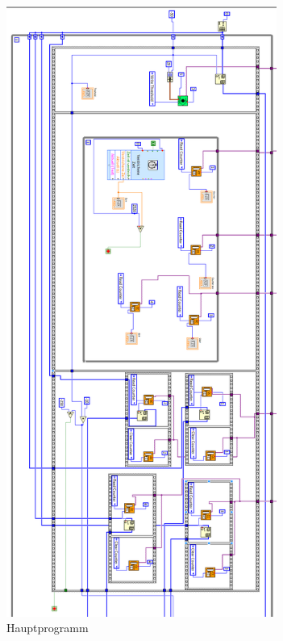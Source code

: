 \begin{figure}
\centering
\includegraphics[height=20cm]{data/friedrich/prog_prog_rot.png}
\caption{Hauptprogramm}
\label{fig:prog_prog}
\end{figure}

